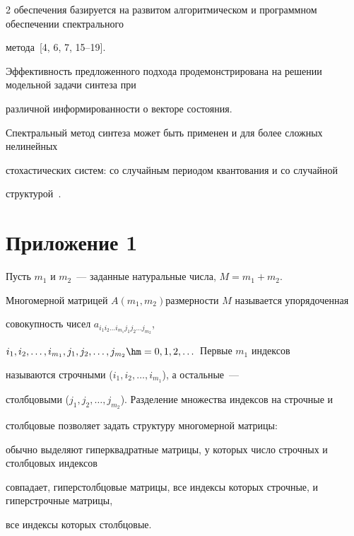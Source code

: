 \begin{multicols}{2}
обеспечения базируется на развитом алгоритмическом и программном обеспечении спектрального 


метода~[4, 6, 7, 15--19]. 


Эффективность предложенного подхода продемонстрирована на решении модельной задачи синтеза при 


различной информированности о векторе состояния.





Спектральный метод синтеза может быть применен и для более сложных нелинейных 


стохастических сис\-тем: со случайным периодом квантования и со случайной 


структурой~\cite{PanRybSot, KazArtBuh}.








\section*{Приложение 1}


{\small





Пусть $m_1$ и $m_2$~--- заданные натуральные числа, ${M = m_1 + m_2}$. 


Многомерной матрицей $A(m_1,m_2)$\linebreak размерности $M$ называется упорядоченная 


совокупность чисел $a_{i_1 i_2 \dots i_{m_1} j_1 j_2 \dots j_{m_2}}$, 


$i_1,i_2,\dots,i_{m_1},j_1,j_2,\dots,j_{m_2} \hm= 0,1,2,\dots$ Первые $m_1$ индексов 


называются строчными ($i_1,i_2,\dots,i_{m_1}$), а остальные~--- 


столбцовыми ($j_1,j_2,\dots,j_{m_2}$). Разделение множества индексов на строчные и 


столбцовые позволяет задать структуру многомерной мат\-ри\-цы:


обычно выделяют гиперквадратные матрицы, у которых число строчных и столбцовых индексов 


совпадает, гиперстолбцовые матрицы, все индексы которых строчные, и гиперстрочные мат\-ри\-цы, 


все индексы которых столбцовые.





}
\end{multicols}
